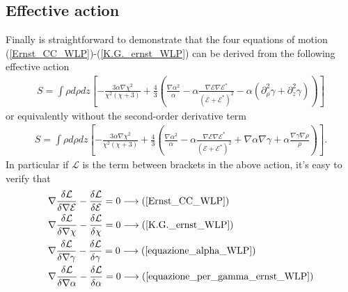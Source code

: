 \subsection{Effective action}
Finally is straightforward to demonstrate that the four equations of motion (\ref{Ernst_CC_WLP})-(\ref{K.G._ernst_WLP}) can be derived from the following effective action
\begin{align}
        S = \int \rho d\rho dz \left[-\frac{3\alpha\nabla\chi^2}{\chi^2(\chi+3)}+ \frac{4}{3} \left(\frac{\nabla\alpha^2}{\alpha} -\alpha\frac{\nabla\mathcal{E}\nabla\mathcal{E}^*}{(\mathcal{E} + \mathcal{E}^*)^2} - \alpha(\partial^2_{\rho}\gamma + \partial^2_z \gamma) \right) \right]
        \label{azione_effettiva_WLP_con_derivate_seconde}
\end{align}
or equivalently without the second-order derivative term 
\begin{align}
        S = \int \rho d\rho dz \left[-\frac{3\alpha\nabla\chi^2}{\chi^2(\chi+3)}+ \frac{4}{3} \left(\frac{\nabla\alpha^2}{\alpha} -\alpha\frac{\nabla\mathcal{E}\nabla\mathcal{E}^*}{(\mathcal{E} + \mathcal{E}^*)^2} +\nabla\alpha\nabla\gamma + \alpha\frac{\nabla\gamma\nabla\rho}{\rho} \right)\right].
        \label{azione_effettiva_WLP_con_derivate_prime}
\end{align}
In particular if $\mathcal{L}$ is the term between brackets in the above action, it's easy to verify that
\begin{align}
    &\nabla \frac{\delta\mathcal{L}}{\delta\nabla\mathcal{E}} - \frac{\delta\mathcal{L}}{\delta\mathcal{E}} =0 \longrightarrow (\ref{Ernst_CC_WLP}) \notag \\
    &\nabla \frac{\delta\mathcal{L}}{\delta\nabla\chi} - \frac{\delta\mathcal{L}}{\delta\chi} =0 \longrightarrow (\ref{K.G._ernst_WLP}) \notag \\
    &\nabla \frac{\delta\mathcal{L}}{\delta\nabla\gamma} - \frac{\delta\mathcal{L}}{\delta\gamma} =0 \longrightarrow (\ref{equazione_alpha_WLP}) \notag \\
    &\nabla \frac{\delta\mathcal{L}}{\delta\nabla\alpha} - \frac{\delta\mathcal{L}}{\delta\alpha} =0 \longrightarrow (\ref{equazione_per_gamma_ernst_WLP}) \notag
\end{align}

